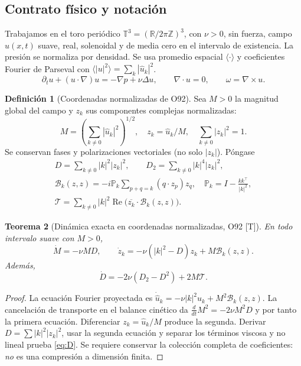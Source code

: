 \documentclass[11pt,a4paper]{article}
\newtheorem{teo}{Teorema}[section]
\theoremstyle{definition}\newtheorem{defi}[teo]{Definición}
\newcommand{\RR}{\mathbb{R}}\newcommand{\TT}{\mathbb{T}}
\newcommand{\mean}[1]{\langle #1\rangle}\newcommand{\pplus}[1]{\left[#1\right]_+}
\newcommand{\stat}[1]{\textcolor{blue!50!black}{\textsf{[#1]}}}
\begin{document}
\subsection{Contrato físico y notación}
Trabajamos en el toro periódico $\TT^3=(\RR/2\pi\mathbb Z)^3$, con $\nu>0$, sin fuerza, campo $u(x,t)$ suave, real, solenoidal y de media cero en el intervalo de existencia. La presión se normaliza por densidad. Se usa promedio espacial $\mean{\cdot}$ y coeficientes Fourier de Parseval con $\mean{|u|^2}=\sum_k|\widehat u_k|^2$.
\begin{equation}\label{eq:NS}
\partial_tu+(u\cdot\nabla)u=-\nabla p+\nu\Delta u,\qquad \nabla\cdot u=0,\qquad \omega=\nabla\times u.
\end{equation}
\begin{defi}[Coordenadas normalizadas de O92]
Sea $M>0$ la magnitud global del campo y $z_k$ sus componentes complejas normalizadas:
\begin{equation}\label{eq:coords}
M=\left(\sum_{k\ne0}|\widehat u_k|^2\right)^{1/2},\quad
z_k=\widehat u_k/M,\quad \sum_{k\ne0}|z_k|^2=1.
\end{equation}
Se conservan fases y polarizaciones vectoriales (no solo $|z_k|$). Póngase
\begin{gather}
D=\sum_{k\ne0}|k|^2|z_k|^2,\qquad D_2=\sum_{k\ne0}|k|^4|z_k|^2,\\
\mathcal B_k(z,z)=-i\mathbb P_k\sum_{p+q=k}(q\cdot z_p)z_q,
\quad \mathbb P_k=I-\frac{kk^\top}{|k|^2},\\
\mathcal T=\sum_{k\ne0}|k|^2\operatorname{Re}\big(\overline{z_k}\cdot\mathcal B_k(z,z)\big).
\end{gather}
\end{defi}
\begin{teo}[Dinámica exacta en coordenadas normalizadas, O92 \stat{T}]
En todo intervalo suave con $M>0$,
\begin{equation}\label{eq:o92}
\boxed{\dot M=-\nu MD,\qquad
\dot z_k=-\nu(|k|^2-D)z_k+M\mathcal B_k(z,z).}
\end{equation}
Además,
\begin{equation}\label{eq:D}
\boxed{\dot D=-2\nu(D_2-D^2)+2M\mathcal T.}
\end{equation}
\end{teo}
\begin{proof}
La ecuación Fourier proyectada es $\dot{\widehat u}_k=-\nu|k|^2\widehat u_k+M^2\mathcal B_k(z,z)$. La cancelación de transporte en el balance cinético da $\frac{d}{dt}M^2=-2\nu M^2D$ y por tanto la primera ecuación. Diferenciar $z_k=\widehat u_k/M$ produce la segunda. Derivar $D=\sum|k|^2|z_k|^2$, usar la segunda ecuación y separar los términos viscosa y no lineal prueba \eqref{eq:D}. Se requiere conservar la colección completa de coeficientes: \emph{no} es una compresión a dimensión finita.
\end{proof}
\end{document}
